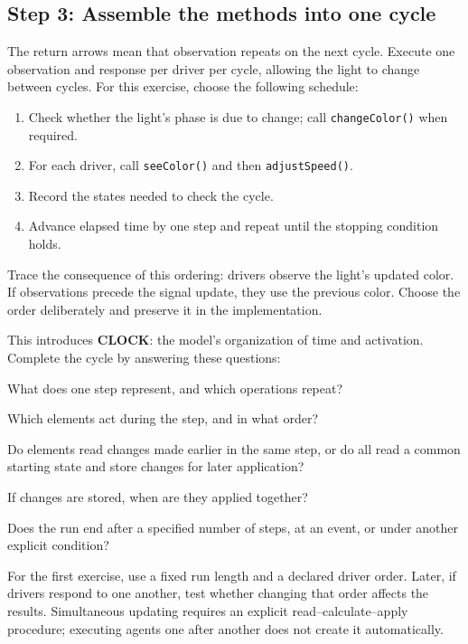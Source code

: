 \documentclass[11pt,a4paper]{article}
\begin{document}
\subsection{Step 3: Assemble the methods into one cycle}

The return arrows mean that observation repeats on the next cycle. Execute one observation and response per driver per cycle, allowing the light to change between cycles. For this exercise, choose the following schedule:

\begin{enumerate}
\item Check whether the light's phase is due to change; call \texttt{changeColor()} when required.
\item For each driver, call \texttt{seeColor()} and then \texttt{adjustSpeed()}.
\item Record the states needed to check the cycle.
\item Advance elapsed time by one step and repeat until the stopping condition holds.
\end{enumerate}

Trace the consequence of this ordering: drivers observe the light's updated color. If observations precede the signal update, they use the previous color. Choose the order deliberately and preserve it in the implementation.


This introduces \textbf{CLOCK}: the model's organization of time and activation. Complete the cycle by answering these questions:
\begin{description}[style=nextline,leftmargin=0pt,itemsep=4pt]
\item[Iteration and time] What does one step represent, and which operations repeat?
\item[Activation and scheduling] Which elements act during the step, and in what order?
\item[Serialization or simultaneous updates] Do elements read changes made earlier in the same step, or do all read a common starting state and store changes for later application?
\item[Synchronization] If changes are stored, when are they applied together?
\item[Termination] Does the run end after a specified number of steps, at an event, or under another explicit condition?
\end{description}

For the first exercise, use a fixed run length and a declared driver order. Later, if drivers respond to one another, test whether changing that order affects the results. Simultaneous updating requires an explicit read--calculate--apply procedure; executing agents one after another does not create it automatically.
\end{document}
